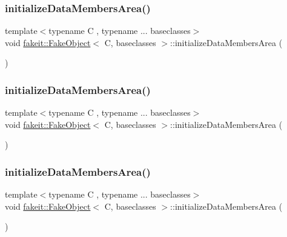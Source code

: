 \subsubsection{\texorpdfstring{initializeDataMembersArea()}{initializeDataMembersArea()}\hspace{0.1cm}{\footnotesize\ttfamily [2/9]}}
{\footnotesize\ttfamily template$<$typename C , typename ... baseclasses$>$ \\
void \mbox{\hyperlink{classfakeit_1_1FakeObject}{fakeit\+::\+Fake\+Object}}$<$ C, baseclasses $>$\+::initialize\+Data\+Members\+Area (\begin{DoxyParamCaption}{ }\end{DoxyParamCaption})\hspace{0.3cm}{\ttfamily [inline]}}

\mbox{\label{classfakeit_1_1FakeObject_a894a7e1ef1e41cec0eb91cbb3d5c73cd}} 
\subsubsection{\texorpdfstring{initializeDataMembersArea()}{initializeDataMembersArea()}\hspace{0.1cm}{\footnotesize\ttfamily [3/9]}}
{\footnotesize\ttfamily template$<$typename C , typename ... baseclasses$>$ \\
void \mbox{\hyperlink{classfakeit_1_1FakeObject}{fakeit\+::\+Fake\+Object}}$<$ C, baseclasses $>$\+::initialize\+Data\+Members\+Area (\begin{DoxyParamCaption}{ }\end{DoxyParamCaption})\hspace{0.3cm}{\ttfamily [inline]}}

\mbox{\label{classfakeit_1_1FakeObject_a894a7e1ef1e41cec0eb91cbb3d5c73cd}} 
\subsubsection{\texorpdfstring{initializeDataMembersArea()}{initializeDataMembersArea()}\hspace{0.1cm}{\footnotesize\ttfamily [4/9]}}
{\footnotesize\ttfamily template$<$typename C , typename ... baseclasses$>$ \\
void \mbox{\hyperlink{classfakeit_1_1FakeObject}{fakeit\+::\+Fake\+Object}}$<$ C, baseclasses $>$\+::initialize\+Data\+Members\+Area (\begin{DoxyParamCaption}{ }\end{DoxyParamCaption})\hspace{0.3cm}{\ttfamily [inline]}}

